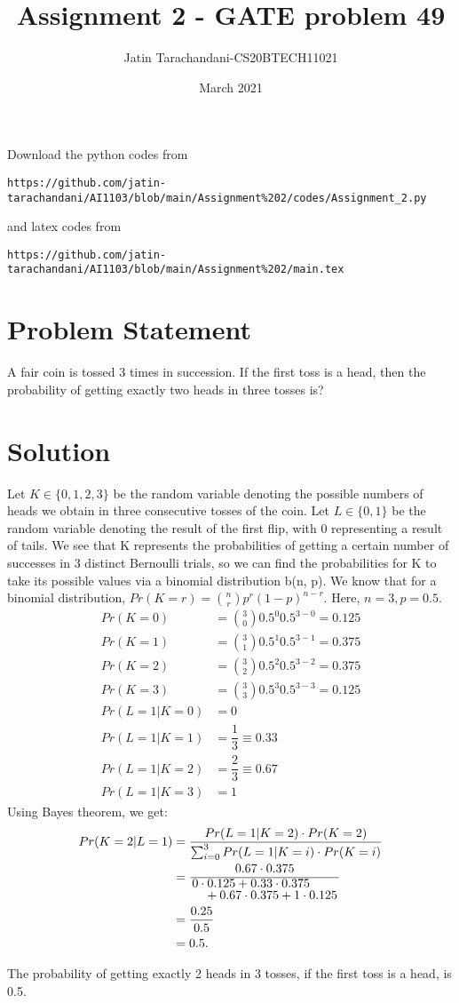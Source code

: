 \documentclass[twocolumn]{article}
\title{Assignment 2 - GATE problem 49}
\author{Jatin Tarachandani-CS20BTECH11021}
\date{March 2021}
\begin{document}
\maketitle
Download the python codes from 
\begin{lstlisting}
https://github.com/jatin-tarachandani/AI1103/blob/main/Assignment%202/codes/Assignment_2.py
\end{lstlisting}
%
and latex codes from 
%
\begin{lstlisting}
https://github.com/jatin-tarachandani/AI1103/blob/main/Assignment%202/main.tex
\end{lstlisting}
\section{Problem Statement}
A fair coin is tossed 3 times in succession. If the first toss is a head, then the probability of getting exactly two heads in three tosses is?
\section{Solution}
Let $K \in \{0, 1, 2, 3\}$ be the random variable denoting the possible numbers of heads we obtain in three consecutive tosses of the coin. Let $L \in \{0, 1\}$ be the random variable denoting the result of the first flip, with 0 representing a result of tails.
We see that K represents the probabilities of getting a certain number of successes in 3 distinct Bernoulli trials, so we can find the probabilities for K to take its possible values via a binomial distribution b(n, p).
We know that for a binomial distribution, $Pr(K=r)=\binom{n}{r}p^r (1-p)^{n-r}$. Here, $n=3, p=0.5$.
\begin{align}
    Pr(K=0)&=\binom{3}{0}0.5^0 0.5^{3-0}=0.125\\
    Pr(K=1)&=\binom{3}{1}0.5^1 0.5^{3-1}=0.375\\
    Pr(K=2)&=\binom{3}{2}0.5^2 0.5^{3-2}=0.375\\
    Pr(K=3)&=\binom{3}{3}0.5^3 0.5^{3-3}=0.125\\
    Pr(L=1|K=0)&=0\\
    Pr(L=1|K=1)&=\dfrac{1}{3} \equiv 0.33\\
    Pr(L=1|K=2)&=\dfrac{2}{3} \equiv 0.67\\
    Pr(L=1|K=3)&=1
\end{align}
Using Bayes theorem, we get:
\begin{align*}
    Pr(K=2|L=1)&=\frac{Pr(L=1|K=2)\cdot Pr(K=2)}{\sum_{i=0}^{3} Pr(L=1|K=i)\cdot Pr(K=i)}\\
    &=\frac{0.67\cdot 0.375}{\splitfrac{0\cdot0.125+0.33\cdot 0.375}{+0.67\cdot 0.375+1\cdot 0.125}}\\
    &=\frac{0.25}{0.5}\\
    &=0.5.
\end{align*}

The probability of getting exactly 2 heads in 3 tosses, if the first toss is a head, is 0.5.
\end{document}
